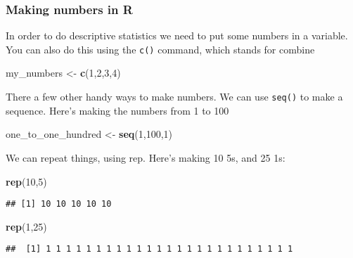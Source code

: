 \documentclass[
]{book}
\newenvironment{Shaded}{\begin{snugshade}}{\end{snugshade}}
\newcommand{\DecValTok}[1]{\textcolor[rgb]{0.00,0.00,0.81}{#1}}
\newcommand{\FunctionTok}[1]{\textcolor[rgb]{0.13,0.29,0.53}{\textbf{#1}}}
\newcommand{\NormalTok}[1]{#1}
\newcommand{\OtherTok}[1]{\textcolor[rgb]{0.56,0.35,0.01}{#1}}
\begin{document}
\hypertarget{making-numbers-in-r}{%
\subsubsection{Making numbers in R}\label{making-numbers-in-r}}

In order to do descriptive statistics we need to put some numbers in a variable. You can also do this using the \texttt{c()} command, which stands for combine

\begin{Shaded}
\begin{Highlighting}[]
\NormalTok{my\_numbers }\OtherTok{\textless{}{-}} \FunctionTok{c}\NormalTok{(}\DecValTok{1}\NormalTok{,}\DecValTok{2}\NormalTok{,}\DecValTok{3}\NormalTok{,}\DecValTok{4}\NormalTok{)}
\end{Highlighting}
\end{Shaded}

There a few other handy ways to make numbers. We can use \texttt{seq()} to make a sequence. Here's making the numbers from 1 to 100

\begin{Shaded}
\begin{Highlighting}[]
\NormalTok{one\_to\_one\_hundred }\OtherTok{\textless{}{-}} \FunctionTok{seq}\NormalTok{(}\DecValTok{1}\NormalTok{,}\DecValTok{100}\NormalTok{,}\DecValTok{1}\NormalTok{)}
\end{Highlighting}
\end{Shaded}

We can repeat things, using rep. Here's making 10 5s, and 25 1s:

\begin{Shaded}
\begin{Highlighting}[]
\FunctionTok{rep}\NormalTok{(}\DecValTok{10}\NormalTok{,}\DecValTok{5}\NormalTok{)}
\end{Highlighting}
\end{Shaded}

\begin{verbatim}
## [1] 10 10 10 10 10
\end{verbatim}

\begin{Shaded}
\begin{Highlighting}[]
\FunctionTok{rep}\NormalTok{(}\DecValTok{1}\NormalTok{,}\DecValTok{25}\NormalTok{)}
\end{Highlighting}
\end{Shaded}

\begin{verbatim}
##  [1] 1 1 1 1 1 1 1 1 1 1 1 1 1 1 1 1 1 1 1 1 1 1 1 1 1
\end{verbatim}
\end{document}
